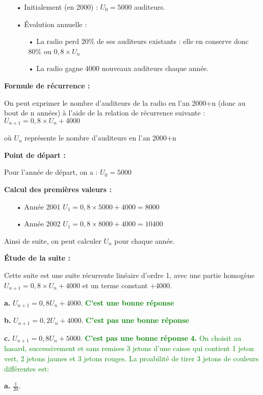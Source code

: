 \documentclass[12pt]{article}
\begin{document}
\begin{itemize}
\item[•] Initialement (en 2000) : $U_{0}=5000$ auditeurs.
\item[•] Évolution annuelle :
\begin{itemize}
\item[•] La radio perd $20\%$ de ses auditeurs existants : elle en conserve donc $80\%$ ou $0,8\times U_{n}$
\item[•] La radio gagne 4000 nouveaux auditeurs chaque année.
\end{itemize}
\end{itemize}
\textbf{Formule de récurrence :}

On peut exprimer le nombre d'auditeurs de la radio en l'an 2000+n (donc au bout de n années) à l'aide de la relation de récurrence suivante :$U_{n+1}=0,8\times U_{n}+4000$

où $ U_{n} $ représente le nombre d'auditeurs en l'an 2000+n

\textbf{Point de départ :} 

Pour l'année de départ, on a : $U_{0}=5000$

\textbf{Calcul des premières valeurs :}

\begin{itemize}
\item[•]Année 2001 $U_{1}=0,8\times 5000+4000=8000$
\item[•]Année 2002 $U_{1}=0,8\times 8000+4000=10400$
\end{itemize}
Ainsi de suite, on peut calculer $U_{n}$ pour chaque année.

\textbf{Étude de la suite :}

Cette suite est une suite récurrente linéaire d'ordre 1, avec une partie homogène\\
$U_{n+1}=0,8\times U_{n}+4000$ et un terme constant +4000.

\textbf{a.} $U_{n+1}=0,8U_{n}+4000$. \textbf{\textcolor{green}{C'est une bonne réponse}}
 
\textbf{b.} $U_{n+1}=0,2U_{n}+4000$. \textbf{\textcolor{green}{C'est pas une bonne réponse}}

\textbf{c.} $U_{n+1}=0,8U_{n}+5000$. \textbf{\textcolor{green}{C'est pas une bonne réponse}}
\newpage
\textcolor{green}{\textbf{4.} On choisit au hasard, successivement et sans remises $3$ jetons d'une caisse qui contient 1 jeton vert, 2 jetons jaunes et 3 jetons rouges. La proabilité de tirer 3 jetons de couleurs différentes est:}

\textbf{a.} $\frac{1}{20}$.
\end{document}

